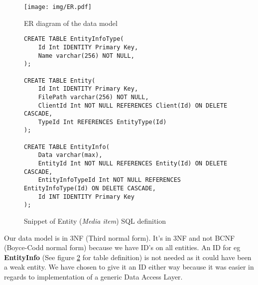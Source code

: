 \documentclass[../report.tex]{subfiles}
\begin{document}
\begin{figure}[H]
\texttt{[image: img/ER.pdf]}
\caption{ER diagram of the data model}
\label{fig:use case diagram}
\end{figure}

\begin{figure}[H]
\begin{lstlisting}
CREATE TABLE EntityInfoType(
	Id Int IDENTITY Primary Key,
	Name varchar(256) NOT NULL,
);

CREATE TABLE Entity(
	Id Int IDENTITY Primary Key,
	FilePath varchar(256) NOT NULL,
	ClientId Int NOT NULL REFERENCES Client(Id) ON DELETE CASCADE,
	TypeId Int REFERENCES EntityType(Id)
);

CREATE TABLE EntityInfo(
	Data varchar(max),
	EntityId Int NOT NULL REFERENCES Entity(Id) ON DELETE CASCADE,
	EntityInfoTypeId Int NOT NULL REFERENCES EntityInfoType(Id) ON DELETE CASCADE,
	Id INT IDENTITY Primary Key
);
\end{lstlisting}
\caption{Snippet of Entity (\textit{Media item}) SQL definition}
\label{datamodel}
\end{figure}

Our data model is in 3NF (Third normal form). It's in 3NF and not BCNF (Boyce-Codd normal form) because we have ID's on all entities. An ID for eg \textbf{EntityInfo} (See figure \ref{datamodel} for table definition) is not needed as it could have been a weak entity. We have chosen to give it an ID either way because it was easier in regards to implementation of a generic Data Access Layer.
\end{document}
